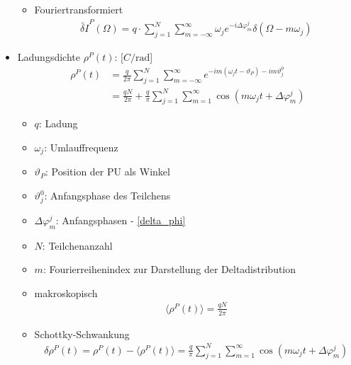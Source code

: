 \documentclass[12pt]{article}%
\renewcommand{\phi}{\varphi}
\renewcommand{\theta}{\vartheta}
\newcommand{\itemf}{\item[$\circ$]}
\begin{document}
\begin{itemize}
\begin{itemize}
	\itemf Fouriertransformiert
	\begin{align}
		\widetilde{\delta I}^P(\Omega) = q \cdot \sum_{j=1}^{N}\sum_{m=-\infty}^{\infty} \omega_j e^{-i \Delta \phi_m^j} \delta(\Omega - m \omega_j)
	\end{align}
	
	\end{itemize}

\item Ladungsdichte $\rho^P(t)$: [$C / \textrm{rad}$]
\begin{subequations}
\begin{align} \label{eq:chargedensity_coasting_longitudinal}
\rho^P(t) &= \frac{q}{2\pi}\sum_{j=1}^{N}\sum_{m=-\infty}^{\infty}e^{-im(\omega_jt - \theta_P) - i m \theta_j^0} \\
&= \frac{qN}{2\pi} + \frac{q}{\pi}\sum_{j=1}^{N}\sum_{m=1}^{\infty}\cos(m\omega_j t + \Delta \phi^j_m)
\end{align}
\end{subequations}

	\begin{itemize}
	
		\item $q$: Ladung
		\item $\omega_j$: Umlauffrequenz
		\item $\theta_P$: Position der PU als Winkel
		\item $\theta_j^0$: Anfangsphase des Teilchens
		\item $\Delta \phi_m^j$: Anfangsphasen - \eqref{delta_phi}
		\item $N$: Teilchenanzahl
		\item $m$: Fourierreihenindex zur Darstellung der Deltadistribution
	
	\end{itemize}
	
	\begin{itemize}
		\itemf makroskopisch
		\begin{align}
			\langle \rho^P(t) \rangle = \frac{qN}{2\pi}
		\end{align}
	
		\itemf Schottky-Schwankung
		\begin{align}
			\delta \rho^P(t) = \rho^P(t) - \langle \rho^P(t)\rangle = \frac{q}{\pi}\sum_{j=1}^{N}\sum_{m=1}^{\infty}\cos(m\omega_j t + \Delta \phi_m^j)
		\end{align}
	
	\end{itemize}


\end{itemize}
\end{document}
